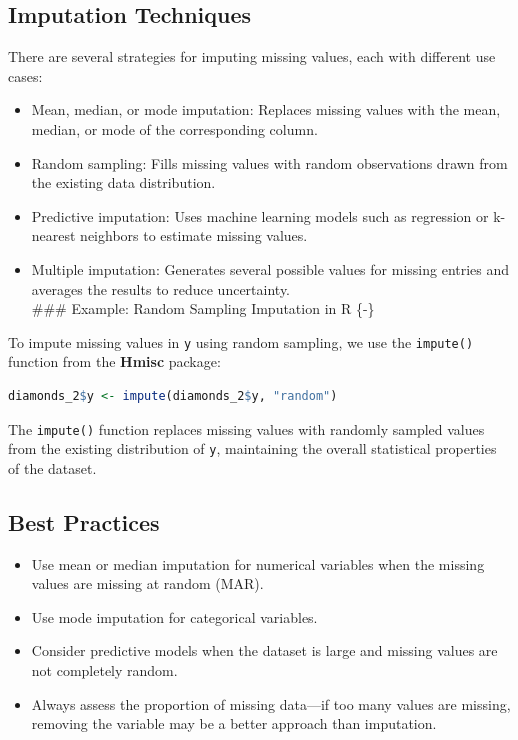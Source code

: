 \documentclass[
  11pt,
]{book}
\newcommand{\passthrough}[1]{#1}
\providecommand{\tightlist}{%
  \setlength{\itemsep}{0pt}\setlength{\parskip}{0pt}}
\theoremstyle{definition}
\theoremstyle{definition}
\theoremstyle{definition}
\theoremstyle{definition}
\theoremstyle{remark}
\begin{document}
\subsection*{Imputation Techniques}\label{imputation-techniques}


There are several strategies for imputing missing values, each with different use cases:

\begin{itemize}
\tightlist
\item
  Mean, median, or mode imputation: Replaces missing values with the mean, median, or mode of the corresponding column.\\
\item
  Random sampling: Fills missing values with random observations drawn from the existing data distribution.\\
\item
  Predictive imputation: Uses machine learning models such as regression or k-nearest neighbors to estimate missing values.\\
\item
  Multiple imputation: Generates several possible values for missing entries and averages the results to reduce uncertainty.\\
  \#\#\# Example: Random Sampling Imputation in R \{-\}
\end{itemize}

To impute missing values in \passthrough{\lstinline!y!} using random sampling, we use the \passthrough{\lstinline!impute()!} function from the \textbf{Hmisc} package:

\begin{lstlisting}[language=R]
diamonds_2$y <- impute(diamonds_2$y, "random")
\end{lstlisting}

The \passthrough{\lstinline!impute()!} function replaces missing values with randomly sampled values from the existing distribution of \passthrough{\lstinline!y!}, maintaining the overall statistical properties of the dataset.

\subsection*{Best Practices}\label{best-practices}


\begin{itemize}
\tightlist
\item
  Use mean or median imputation for numerical variables when the missing values are missing at random (MAR).\\
\item
  Use mode imputation for categorical variables.\\
\item
  Consider predictive models when the dataset is large and missing values are not completely random.\\
\item
  Always assess the proportion of missing data---if too many values are missing, removing the variable may be a better approach than imputation.
\end{itemize}
\end{document}

